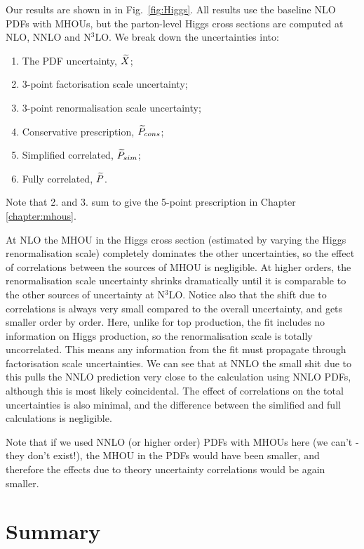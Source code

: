 Our results are shown in in Fig.~\ref{fig:Higgs}. All results use the baseline NLO PDFs with MHOUs, but the parton-level Higgs cross sections are computed at NLO, NNLO and N$^3$LO. We break down the uncertainties into: 
\begin{enumerate}
\item The PDF uncertainty, $\widetilde{X}$;
\item 3-point factorisation scale uncertainty; 
\item 3-point renormalisation scale uncertainty;
\item Conservative prescription, $\widetilde{P}_{cons}$;
\item Simplified correlated, $\widetilde{P}_{sim}$;
\item Fully correlated, $\widetilde{P}$.
\end{enumerate}
Note that 2. and 3. sum to give the 5-point prescription in Chapter \ref{chapter:mhous}. 

At NLO the MHOU in the Higgs cross section (estimated by varying the Higgs renormalisation scale) completely dominates the other uncertainties, so the effect of correlations between the sources of MHOU is negligible.  At higher orders, the renormalisation scale uncertainty shrinks dramatically until it is comparable to the other sources of uncertainty at N$^3$LO. Notice also that the shift due to correlations is always very small compared to the overall uncertainty, and gets smaller order by order. Here, unlike for top production, the fit includes no information on Higgs production, so the renormalisation scale is totally uncorrelated. This means any information from the fit must propagate through factorisation scale uncertainties. We can see that at NNLO the small shit due to this pulls the NNLO prediction very close to the calculation using NNLO PDFs, although this is most likely coincidental. The effect of correlations on the total uncertainties is also minimal, and the difference between the simlified and full calculations is negligible. 

Note that if we used NNLO (or higher order) PDFs with MHOUs here (we can't - they don't exist!), the MHOU in the PDFs would have been smaller, and therefore the effects due to theory uncertainty correlations would be again smaller.

\section{Summary}
\label{sec:p5}

